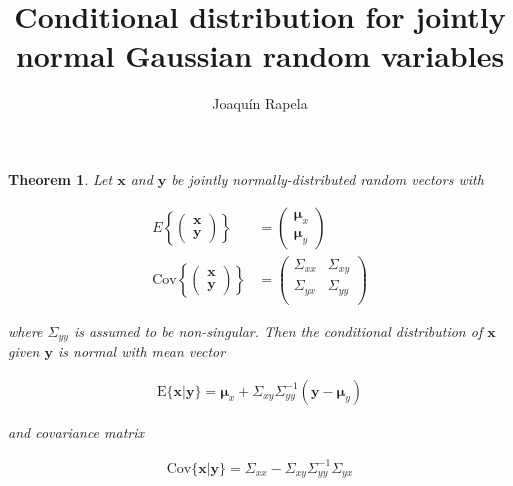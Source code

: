 \documentclass[12pt]{article}
\title{Conditional distribution for jointly normal Gaussian random variables}
\author{Joaquín Rapela}
\newtheorem{theorem}{Theorem}
\begin{document}
\maketitle

\begin{theorem}

    Let $\mathbf{x}$ and $\mathbf{y}$ be jointly normally-distributed random
    vectors with

    \begin{align*}
        E\left\{\left(\begin{array}{c}
                          \mathbf{x}\\
                          \mathbf{y}
                      \end{array}\right)\right\}&=\left(\begin{array}{c}
                                                           \boldsymbol{\mu}_x\\
                                                           \boldsymbol{\mu}_y
                                                       \end{array}\right)\\
        \text{Cov}\left\{\left(\begin{array}{c}
                                   \mathbf{x}\\
                                   \mathbf{y}
                               \end{array}\right)\right\}&=\left(\begin{array}{cc}
                                                                     \Sigma_{xx} & \Sigma_{xy} \\
                                                                     \Sigma_{yx} & \Sigma_{yy} \\
                                                                  \end{array}\right)
    \end{align*}

    \noindent where $\Sigma_{yy}$ is assumed to be non-singular.
    Then the conditional distribution of $\mathbf{x}$ given $\mathbf{y}$ is
    normal with mean vector

    \begin{align*}
        \text{E}\{\mathbf{x}|\mathbf{y}\}=\boldsymbol{\mu}_x+\Sigma_{xy}\Sigma_{yy}^{-1}(\mathbf{y}-\boldsymbol{\mu}_y)
    \end{align*}

    \noindent and covariance matrix

    \begin{align*}
        \text{Cov}\{\mathbf{x}|\mathbf{y}\}=\Sigma_{xx}-\Sigma_{xy}\Sigma_{yy}^{-1}\Sigma_{yx}
    \end{align*}
\end{theorem}
\end{document}
